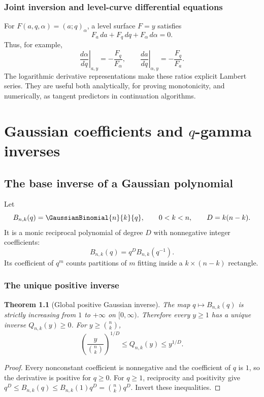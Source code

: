 \documentclass[11pt,oneside]{book}
\newtheorem{theorem}{Theorem}[chapter]
\theoremstyle{definition}
\theoremstyle{remark}
\begin{document}
\section{Joint inversion and level-curve differential equations}
For $F(a,q,\alpha)=(a;q)_\alpha$, a level surface $F=y$ satisfies
\[
 F_a\,da+F_q\,dq+F_\alpha\,d\alpha=0.
\]
Thus, for example,
\[
 \left.\frac{d\alpha}{dq}\right|_{a,y}
 =-\frac{F_q}{F_\alpha},
 \qquad
 \left.\frac{da}{dq}\right|_{\alpha,y}
 =-\frac{F_q}{F_a}.
\]
The logarithmic derivative representations make these ratios explicit Lambert
series.  They are useful both analytically, for proving monotonicity, and
numerically, as tangent predictors in continuation algorithms.

\part{Gaussian coefficients and $q$-gamma inverses}

\chapter{The base inverse of a Gaussian polynomial}

Let
\[
 B_{n,k}(q)=\GaussianBinomial{n}{k}{q},
 \qquad 0<k<n,
 \qquad D=k(n-k).
\]
It is a monic reciprocal polynomial of degree $D$ with nonnegative integer
coefficients:
\begin{equation}\label{eq:qbinom-reciprocity}
 B_{n,k}(q)=q^D B_{n,k}(q^{-1}).
\end{equation}
Its coefficient of $q^m$ counts partitions of $m$ fitting inside a
$k\times(n-k)$ rectangle.

\section{The unique positive inverse}
\begin{theorem}[Global positive Gaussian inverse]\label{thm:qbinom-positive-inverse}
The map $q\mapsto B_{n,k}(q)$ is strictly increasing from $1$ to $+\infty$ on
$[0,\infty)$.  Therefore every $y\ge1$ has a unique inverse
$Q_{n,k}(y)\ge0$.  For $y\ge\binom nk$,
\begin{equation}\label{eq:qbinom-global-bounds}
 \left(\frac{y}{\binom nk}\right)^{1/D}
 \le Q_{n,k}(y)\le y^{1/D}.
\end{equation}
\end{theorem}
\begin{proof}
Every nonconstant coefficient is nonnegative and the coefficient of $q$ is
$1$, so the derivative is positive for $q\ge0$.  For $q\ge1$, reciprocity and
positivity give
$q^D\le B_{n,k}(q)\le B_{n,k}(1)q^D=\binom nk q^D$.
Invert these inequalities.
\end{proof}
\end{document}
